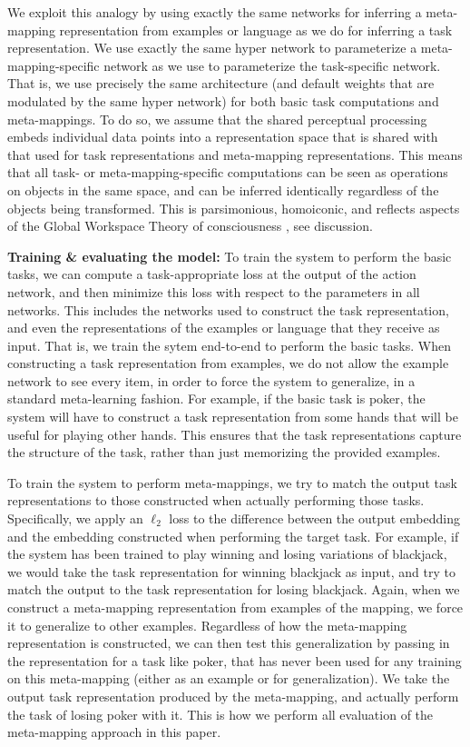 We exploit this analogy by using exactly the same networks for inferring a meta-mapping representation from examples or language as we do for inferring a task representation. We use exactly the same hyper network to parameterize a meta-mapping-specific network as we use to parameterize the task-specific network. That is, we use precisely the same architecture (and default weights that are modulated by the same hyper network) for both basic task computations and meta-mappings. To do so, we assume that the shared perceptual processing embeds individual data points into a representation space that is shared with that used for task representations and meta-mapping representations. This means that all task- or meta-mapping-specific computations can be seen as operations on objects in the same space, and can be inferred identically regardless of the objects being transformed. This is parsimonious, homoiconic, and reflects aspects of the Global Workspace Theory of consciousness \citep{Baars2005}, see discussion.   

\textbf{Training \& evaluating the model:} To train the system to perform the basic tasks, we can compute a task-appropriate loss at the output of the action network, and then minimize this loss with respect to the parameters in all networks. This includes the networks used to construct the task representation, and even the representations of the examples or language that they receive as input. That is, we train the sytem end-to-end to perform the basic tasks. When constructing a task representation from examples, we do not allow the example network to see every item, in order to force the system to generalize, in a standard meta-learning fashion. For example, if the basic task is poker, the system will have to construct a task representation from some hands that will be useful for playing other hands. This ensures that the task representations capture the structure of the task, rather than just memorizing the provided examples. 

To train the system to perform meta-mappings, we try to match the output task representations to those constructed when actually performing those tasks. Specifically, we apply an \(\ell_2\) loss to the difference between the output embedding and the embedding constructed when performing the target task. For example, if the system has been trained to play winning and losing variations of blackjack, we would take the task representation for winning blackjack as input, and try to match the output to the task representation for losing blackjack. Again, when we construct a meta-mapping representation from examples of the mapping, we force it to generalize to other examples. Regardless of how the meta-mapping representation is constructed, we can then test this generalization by passing in the representation for a task like poker, that has never been used for any training on this meta-mapping (either as an example or for generalization). We take the output task representation produced by the meta-mapping, and actually perform the task of losing poker with it. This is how we perform all evaluation of the meta-mapping approach in this paper.

